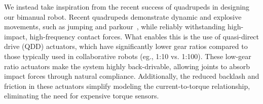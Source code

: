 




We instead take inspiration from the recent success of quadrupeds in designing our bimanual robot. Recent quadrupeds demonstrate dynamic and explosive movements, such as jumping and parkour~\cite{hoeller2024anymal, cheng2024extreme}, while reliably withstanding high-impact, high-frequency contact forces. What enables this is the use of quasi-direct drive (QDD) actuators, which have significantly lower gear ratios compared to those typically used in collaborative robots (eg., 1:10 vs. 1:100). These low-gear ratio actuators make the system highly back-drivable, allowing joints to absorb impact forces through natural compliance. Additionally, the reduced backlash and friction in these actuators simplify modeling the current-to-torque relationship, eliminating the need for expensive torque sensors.

